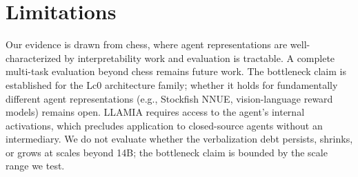 \section*{Limitations}
\label{sec:limitations}

Our evidence is drawn from chess, where agent representations are well-characterized by interpretability work and evaluation is tractable. A complete multi-task evaluation beyond chess remains future work. The bottleneck claim is established for the Lc0 architecture family; whether it holds for fundamentally different agent representations (e.g., Stockfish NNUE, vision-language reward models) remains open. LLAMIA requires access to the agent's internal activations, which precludes application to closed-source agents without an intermediary. We do not evaluate whether the verbalization debt persists, shrinks, or grows at scales beyond 14B; the bottleneck claim is bounded by the scale range we test.
